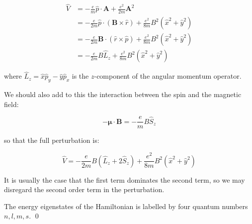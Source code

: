 \documentclass[12pt]{article}
\begin{document}
\begin{equation}
    \begin{split}
        \hat{V} &= -\frac{e}{m} \hat{p} \cdot \mathbf{A} + \frac{e^{2}}{2m} \mathbf{A}^{2} \\
        &= -\frac{e}{2m} \hat{p} \cdot (\mathbf{B} \times \hat{r}) + \frac{e^{2}}{8m} B^{2} (\hat{x}^{2} + \hat{y}^{2}) \\
        &= -\frac{e}{2m} \mathbf{B} \cdot (\hat{r} \times \hat{p}) + \frac{e^{2}}{8m} B^{2} (\hat{x}^{2} + \hat{y}^{2}) \\
        &= -\frac{e}{2m} B \hat{L}_{z} + \frac{e^{2}}{8m} B^{2} (\hat{x}^{2} + \hat{y}^{2})
    \end{split}
\end{equation}

where $\hat{L}_{z} = \hat{x}\hat{p}_{y} - \hat{y}\hat{p}_{x}$ is the $z$-component of the angular momentum operator.

We should also add to this the interaction between the spin and the magnetic field:

\begin{equation}
    -\mathbf{\mu} \cdot \mathbf{B} = -\frac{e}{m} B \hat{S}_{z}
\end{equation}

so that the full perturbation is:

\begin{equation}
    \hat{V} = -\frac{e}{2m} B (\hat{L}_{z} + 2\hat{S}_{z}) + \frac{e^{2}}{8m} B^{2} (\hat{x}^{2} + \hat{y}^{2})
\end{equation}

It is usually the case that the first term dominates the second term, so we may disregard the second order term in the perturbation.

The energy eigenstates of the Hamiltonian is labelled by four quantum numbers $n, l, m, s$.
\qed
\end{document}
